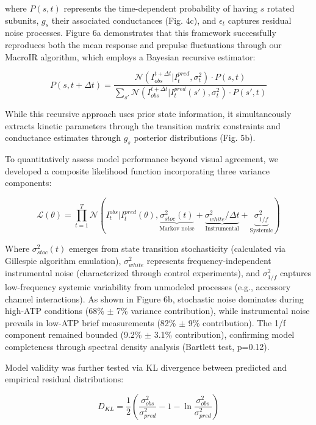 \documentclass[pdflatex,sn-mathphys-num]{sn-jnl}%
\theoremstyle{thmstyleone}%
\theoremstyle{thmstyletwo}%
\theoremstyle{thmstylethree}%
\begin{document}
\noindent where $P(s,t)$ represents the time-dependent probability of having $s$ rotated subunits, $g_s$ their associated conductances (Fig. 4c), and $\epsilon_t$ captures residual noise processes. Figure 6a demonstrates that this framework successfully reproduces both the mean response and prepulse fluctuations through our MacroIR algorithm, which employs a Bayesian recursive estimator:

\begin{equation}
	P(s,t+\Delta t) = \frac{\mathcal{N}(I_{obs}^{t+\Delta t}|I_t^{pred},\sigma_t^2) \cdot P(s,t)}{\sum_{s'}\mathcal{N}(I_{obs}^{t+\Delta t}|I_{t}^{pred}(s'),\sigma_t^2) \cdot P(s',t)}
\end{equation}

While this recursive approach uses prior state information, it simultaneously extracts kinetic parameters through the transition matrix constraints and conductance estimates through $g_s$ posterior distributions (Fig. 5b).

To quantitatively assess model performance beyond visual agreement, we developed a composite likelihood function incorporating three variance components:

\begin{equation}
	\mathcal{L}(\theta) = \prod_{t=1}^T \mathcal{N}\left(I_t^{obs} \big| I_t^{pred}(\theta), \underbrace{\sigma_{stoc}^2(t)}_{\text{Markov noise}} + \underbrace{\sigma_{white}^2/\Delta t}_{\text{Instrumental}} + \underbrace{\sigma_{1/f}^2}_{\text{Systemic}}\right)
\end{equation}

Where $\sigma_{stoc}^2(t)$ emerges from state transition stochasticity (calculated via Gillespie algorithm emulation), $\sigma_{white}^2$ represents frequency-independent instrumental noise (characterized through control experiments), and $\sigma_{1/f}^2$ captures low-frequency systemic variability from unmodeled processes (e.g., accessory channel interactions). As shown in Figure 6b, stochastic noise dominates during high-ATP conditions (68\% $\pm$ 7\% variance contribution), while instrumental noise prevails in low-ATP brief measurements (82\% $\pm$ 9\% contribution). The 1/f component remained bounded (9.2\% $\pm$ 3.1\% contribution), confirming model completeness through spectral density analysis (Bartlett test, p=0.12).

Model validity was further tested via KL divergence between predicted and empirical residual distributions:

\begin{equation}
	D_{KL} = \frac{1}{2}\left(\frac{\sigma_{obs}^2}{\sigma_{pred}^2} - 1 - \ln\frac{\sigma_{obs}^2}{\sigma_{pred}^2}\right)
\end{equation}
\end{document}

